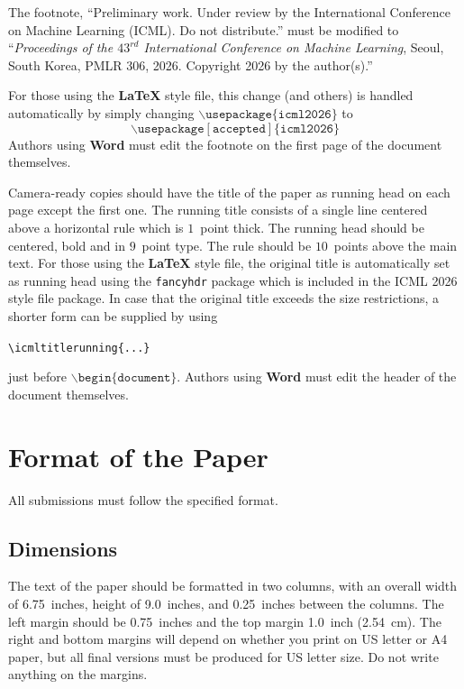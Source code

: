 \documentclass{article}
\theoremstyle{plain}
\theoremstyle{definition}
\theoremstyle{remark}
\begin{document}
The footnote, ``Preliminary work. Under review by the International
Conference on Machine Learning (ICML). Do not distribute.'' must be
modified to ``\textit{Proceedings of the
  $\mathit{43}^{rd}$ International Conference on Machine Learning},
Seoul, South Korea, PMLR 306, 2026.
Copyright 2026 by the author(s).''

For those using the \textbf{\LaTeX} style file, this change (and others) is
handled automatically by simply changing
$\mathtt{\backslash usepackage\{icml2026\}}$ to
$$\mathtt{\backslash usepackage[accepted]\{icml2026\}}$$
Authors using \textbf{Word} must edit the
footnote on the first page of the document themselves.

Camera-ready copies should have the title of the paper as running head
on each page except the first one. The running title consists of a
single line centered above a horizontal rule which is $1$~point thick.
The running head should be centered, bold and in $9$~point type. The
rule should be $10$~points above the main text. For those using the
\textbf{\LaTeX} style file, the original title is automatically set as running
head using the \texttt{fancyhdr} package which is included in the ICML
2026 style file package. In case that the original title exceeds the
size restrictions, a shorter form can be supplied by using

\verb|\icmltitlerunning{...}|

just before $\mathtt{\backslash begin\{document\}}$.
Authors using \textbf{Word} must edit the header of the document themselves.

\section{Format of the Paper}

All submissions must follow the specified format.

\subsection{Dimensions}

The text of the paper should be formatted in two columns, with an
overall width of 6.75~inches, height of 9.0~inches, and 0.25~inches
between the columns. The left margin should be 0.75~inches and the top
margin 1.0~inch (2.54~cm). The right and bottom margins will depend on
whether you print on US letter or A4 paper, but all final versions
must be produced for US letter size.
Do not write anything on the margins.
\end{document}
